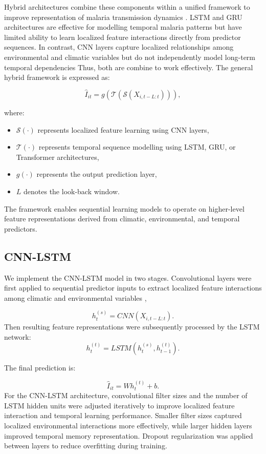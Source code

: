 Hybrid architectures combine these components within a unified framework to improve representation of malaria transmission dynamics \cite{Srivastava2025}. LSTM and GRU architectures are effective for modelling temporal malaria patterns but have limited ability to learn localized feature interactions directly from predictor sequences. In contrast, CNN layers capture localized relationships among environmental and climatic variables but do not independently model long-term temporal dependencies Thus, both are combine to work effectively.
The general hybrid framework is expressed as:

\[
\hat{I}_{it} = g\left( \mathcal{T} \left( \mathcal{S}(X_{i,t-L:t}) \right) \right),
\]

where:
\begin{itemize}
	\item $\mathcal{S}(\cdot)$ represents localized feature learning using CNN layers,
	\item $\mathcal{T}(\cdot)$ represents temporal sequence modelling using LSTM, GRU, or Transformer architectures,
	\item $g(\cdot)$ represents the output prediction layer,
	\item $L$ denotes the look-back window.
\end{itemize}

The framework enables sequential learning models to operate on higher-level feature representations derived from climatic, environmental, and temporal predictors.


\subsection{CNN-LSTM}

We implement the CNN-LSTM model in two stages. Convolutional layers were first applied to sequential predictor inputs to extract localized feature interactions among climatic and environmental variables \cite{Srivastava2025},

\[
h^{(s)}_t = CNN(X_{i,t-L:t}).
\]
Then resulting feature representations were subsequently processed by the LSTM network:	
\[
h^{(t)}_t = LSTM(h^{(s)}_t, h^{(t)}_{t-1}).
\]

The final prediction is:

\[
\hat{I}_{it} = W h^{(t)}_t + b.
\]
For the CNN-LSTM architecture, convolutional filter sizes and the number of LSTM hidden units were adjusted iteratively to improve  localized feature interaction and temporal learning performance. Smaller filter sizes captured localized environmental interactions more effectively, while larger hidden layers improved temporal memory representation. Dropout regularization was applied between layers to reduce overfitting during training.

